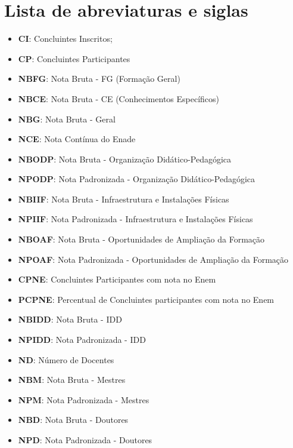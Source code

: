 \section*{Lista de abreviaturas e siglas}
\begin{itemize}[label={}]
\item \textbf{CI}: Concluintes Inscritos;
\item \textbf{CP}: Concluintes Participantes
\item \textbf{NBFG}: Nota Bruta - FG (Formação Geral)
\item \textbf{NBCE}: Nota Bruta - CE (Conhecimentos Específicos)        
\item \textbf{NBG}: Nota Bruta - Geral                                       
\item \textbf{NCE}: Nota Contínua do Enade                                   
\item \textbf{NBODP}: Nota Bruta - Organização Didático-Pedagógica             
\item \textbf{NPODP}: Nota Padronizada - Organização Didático-Pedagógica       
\item \textbf{NBIIF}: Nota Bruta - Infraestrutura e Instalações Físicas        
\item \textbf{NPIIF}: Nota Padronizada - Infraestrutura e Instalações Físicas  
\item \textbf{NBOAF}: Nota Bruta - Oportunidades de Ampliação da Formação      
\item \textbf{NPOAF}: Nota Padronizada - Oportunidades de Ampliação da Formação
\item \textbf{CPNE}: Concluintes Participantes com nota no Enem               
\item \textbf{PCPNE}: Percentual de Concluintes participantes com nota no Enem 
\item \textbf{NBIDD}: Nota Bruta - IDD                                         
\item \textbf{NPIDD}: Nota Padronizada - IDD                                   
\item \textbf{ND}: Número de Docentes                                          
\item \textbf{NBM}: Nota Bruta - Mestres                                     
\item \textbf{NPM}: Nota Padronizada - Mestres                               
\item \textbf{NBD}: Nota Bruta - Doutores                                    
\item \textbf{NPD}: Nota Padronizada - Doutores                              

\end{itemize}
